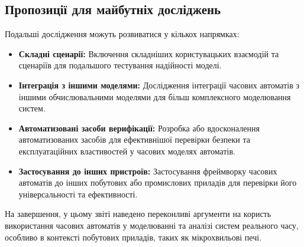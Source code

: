 \documentclass[12pt,a4paper]{article}
\begin{document}
\subsection{Пропозиції для майбутніх досліджень}
Подальші дослідження можуть розвиватися у кількох напрямках:
\begin{itemize}
    \item \textbf{Складні сценарії:} Включення складніших користувацьких взаємодій та сценаріїв для подальшого тестування надійності моделі.
    \item \textbf{Інтеграція з іншими моделями:} Дослідження інтеграції часових автоматів з іншими обчислювальними моделями для більш комплексного моделювання систем.
    \item \textbf{Автоматизовані засоби верифікації:} Розробка або вдосконалення автоматизованих засобів для ефективнішої перевірки безпеки та експлуатаційних властивостей у часових моделях автоматів.
    \item \textbf{Застосування до інших пристроїв:} Застосування фреймворку часових автоматів до інших побутових або промислових приладів для перевірки його універсальності та ефективності.
\end{itemize}

На завершення, у цьому звіті наведено переконливі аргументи на користь використання часових автоматів у моделюванні та аналізі систем реального часу, особливо в контексті побутових приладів, таких як мікрохвильові печі.
\end{document}
